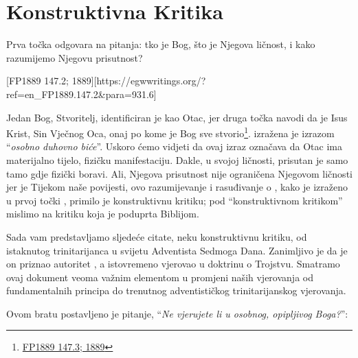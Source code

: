 \chapter{Konstruktivna Kritika}

Prva točka  odgovara na pitanja: tko je Bog, što je Njegova ličnost, i kako razumijemo Njegovu prisutnost?

[FP1889 147.2; 1889][https://egwwritings.org/?ref=en\_FP1889.147.2&para=931.6]

Jedan Bog, Stvoritelj, identificiran je kao Otac, jer druga točka  navodi da je Isus Krist, Sin Vječnog Oca, onaj po kome je Bog sve stvorio\footnote{\href{https://egwwritings.org/?ref=en_FP1889.147.3&para=931.7}{FP1889 147.3; 1889}}.  izražena je izrazom “\textit{osobno duhovno biće}”. Uskoro ćemo vidjeti da ovaj izraz označava da Otac ima materijalno tijelo, fizičku manifestaciju. Dakle, u svojoj ličnosti, prisutan je samo tamo gdje fizički boravi. Ali, Njegova prisutnost nije ograničena Njegovom ličnosti jer je  Tijekom naše povijesti, ovo razumijevanje i rasuđivanje o , kako je izraženo u prvoj točki , primilo je konstruktivnu kritiku; pod “konstruktivnom kritikom” mislimo na kritiku koja je poduprta Biblijom.

Sada vam predstavljamo sljedeće citate, neku konstruktivnu kritiku, od istaknutog trinitarijanca u svijetu Adventista Sedmoga Dana. Zanimljivo je da je on priznao autoritet , a istovremeno vjerovao u doktrinu o Trojstvu. Smatramo ovaj dokument veoma važnim elementom u promjeni naših vjerovanja od fundamentalnih principa do trenutnog adventističkog trinitarijanskog vjerovanja.

Ovom bratu postavljeno je pitanje, “\textit{Ne vjerujete li u osobnog, opipljivog Boga?}”:


